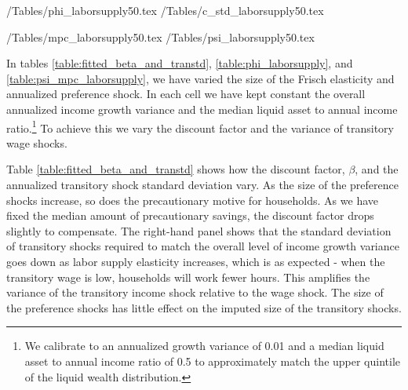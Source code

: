 \documentclass[titlepage]{\econtex}\newcommand{\texname}{ConsumptionHeterogeneity}
\begin{document}
\begin{center}
	\econtexRoot/Tables/phi_laborsupply50.tex	
	\econtexRoot/Tables/c_std_laborsupply50.tex		
	\label{table:phi_laborsupply}
\end{center}

\begin{center}
	\econtexRoot/Tables/mpc_laborsupply50.tex
	\econtexRoot/Tables/psi_laborsupply50.tex		
	\label{table:psi_mpc_laborsupply}
\end{center}

In tables \ref{table:fitted_beta_and_transtd}, \ref{table:phi_laborsupply}, and \ref{table:psi_mpc_laborsupply}, we have varied the size of the Frisch elasticity and annualized preference shock. In each cell we have kept constant the overall annualized income growth variance and the median liquid asset to annual income ratio.\footnote{We calibrate to an annualized growth variance of 0.01 and a median liquid asset to annual income ratio of 0.5 to approximately match the upper quintile of the liquid wealth distribution.} To achieve this we vary the discount factor and the variance of transitory wage shocks.

Table \ref{table:fitted_beta_and_transtd} shows how the discount factor, $\beta$, and the annualized transitory shock standard deviation vary. As the size of the preference shocks increase, so does the precautionary motive for households. As we have fixed the median amount of precautionary savings, the discount factor drops slightly to compensate. The right-hand panel shows that the standard deviation of transitory shocks required to match the overall level of income growth variance goes down as labor supply elasticity increases, which is as expected - when the transitory wage is low, households will work fewer hours. This amplifies the variance of the transitory income shock relative to the wage shock. The size of the preference shocks has little effect on the imputed size of the transitory shocks.
\end{document}
